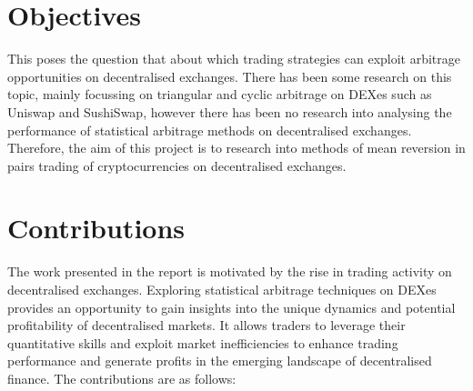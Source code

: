 \section{Objectives}
This poses the question that about which trading strategies can exploit arbitrage opportunities on decentralised exchanges. There has been some research on this topic, mainly focussing on triangular and cyclic arbitrage on DEXes such as Uniswap and SushiSwap, however there has been no research into analysing the performance of statistical arbitrage methods on decentralised exchanges. Therefore, the aim of this project is to research into methods of mean reversion in pairs trading of cryptocurrencies on decentralised exchanges.

\section{Contributions}
The work presented in the report is motivated by the rise in trading activity on decentralised exchanges. Exploring statistical arbitrage techniques on DEXes provides an opportunity to gain insights into the unique dynamics and potential profitability of decentralised markets. It allows traders to leverage their quantitative skills and exploit market inefficiencies to enhance trading performance and generate profits in the emerging landscape of decentralised finance. The contributions are as follows:
